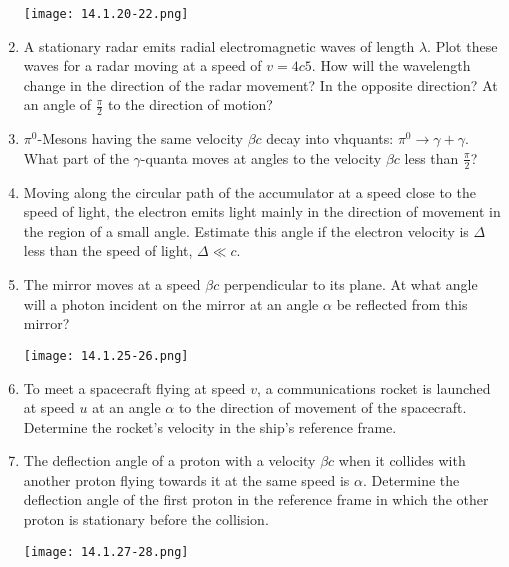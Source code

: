 \documentclass{article}
\begin{document}
\begin{enumerate}[label=14.1.\arabic*]
\begin{center}
    \texttt{[image: 14.1.20-22.png]}
\end{center}

\item A stationary radar emits radial electromagnetic waves of length $\lambda$. Plot these waves for a radar moving at a speed of $v = {4c}{5}$. How will the wavelength change in the direction of the radar movement? In the opposite direction? At an angle of $\frac{\pi}{2}$ to the direction of motion?

\item $\pi^0$-Mesons having the same velocity $\beta c$ decay into vhquants: $\pi^0 \to \gamma + \gamma$. What part of the $\gamma$-quanta moves at angles to the velocity $\beta c$ less than $\frac{\pi}{2}$?

\item Moving along the circular path of the accumulator at a speed close to the speed of light, the electron emits light mainly in the direction of movement in the region of a small angle. Estimate this angle if the electron velocity is $\Delta$ less than the speed of light, $\Delta \ll c$.

\item The mirror moves at a speed $\beta c$ perpendicular to its plane. At what angle will a photon incident on the mirror at an angle $\alpha$ be reflected from this mirror?

\begin{center}
    \texttt{[image: 14.1.25-26.png]}
\end{center}

\item To meet a spacecraft flying at speed $v$, a communications rocket is launched at speed $u$ at an angle $\alpha$ to the direction of movement of the spacecraft. Determine the rocket's velocity in the ship's reference frame.

\item The deflection angle of a proton with a velocity $\beta c$ when it collides with another proton flying towards it at the same speed is $\alpha$. Determine the deflection angle of the first proton in the reference frame in which the other proton is stationary before the collision.

\begin{center}
    \texttt{[image: 14.1.27-28.png]}
\end{center}


\end{enumerate}
\end{document}

